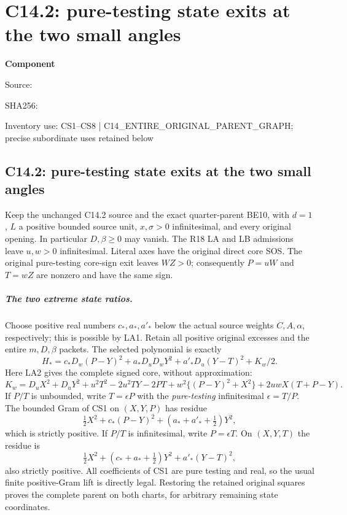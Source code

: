 \chapter{C14.2: pure-testing state exits at the two small angles}
\label{component:p8655d641d4a7}
\noindent\textbf{Component }\par
{\small\noindent Source: \par}
{\small\noindent SHA256: \par}
{\small\noindent Inventory use: CS1--CS8 | C14\_\allowbreak{}ENTIRE\_\allowbreak{}ORIGINAL\_\allowbreak{}PARENT\_\allowbreak{}GRAPH; precise subordinate uses retained below\par}
\medskip
\section{C14.2: pure-testing state exits at the two small angles}

Keep the unchanged C14.2 source and the exact quarter-parent BE10,
with $d=1$, $L$ a positive bounded source unit, $x,\sigma>0$
infinitesimal, and every original opening.  In particular $D,\beta\ge0$
may vanish.  The R18 LA and LB admissions leave $u,w>0$
infinitesimal.  Literal axes have the original direct core SOS.
The original pure-testing core-sign exit leaves $WZ>0$; consequently
$P=uW$ and $T=wZ$ are nonzero and have the same sign.

\paragraph{The two extreme state ratios.}
Choose positive real numbers $c_*,a_*,a'_* $ below the actual
source weights $C,A,\alpha$, respectively; this is possible by LA1.
Retain all positive original excesses and the entire $m,D,\beta$
packets.  The selected polynomial is exactly
\[
 H_*=c_*D_w(P-Y)^2+a_*D_uD_wY^2
       +a'_*D_u(Y-T)^2+K_w/2.                     \tag{CS1}
\]
Here LA2 gives the complete signed core, without approximation:
\[
 K_w=D_uX^2+D_uY^2+u^2T^2-2u^2TY-2PT
       +w^2\{(P-Y)^2+X^2\}+2uwX(T+P-Y).          \tag{CS2}
\]
If $P/T$ is unbounded, write $T=\epsilon P$ with the
\emph{pure-testing} infinitesimal $\epsilon=T/P$.  The bounded
Gram of CS1 on $(X,Y,P)$ has residue
\[
 \tfrac12X^2+c_*(P-Y)^2+(a_*+a'_*+\tfrac12)Y^2,
                                                               \tag{CS3}
\]
which is strictly positive.  If $P/T$ is infinitesimal, write
$P=\epsilon T$.  On $(X,Y,T)$ the residue is
\[
 \tfrac12X^2+(c_*+a_*+\tfrac12)Y^2+a'_*(Y-T)^2,  \tag{CS4}
\]
also strictly positive.  All coefficients of CS1 are pure testing
and real, so the usual finite positive-Gram lift is directly legal.
Restoring the retained original squares proves the complete parent
on both charts, for arbitrary remaining state coordinates.

